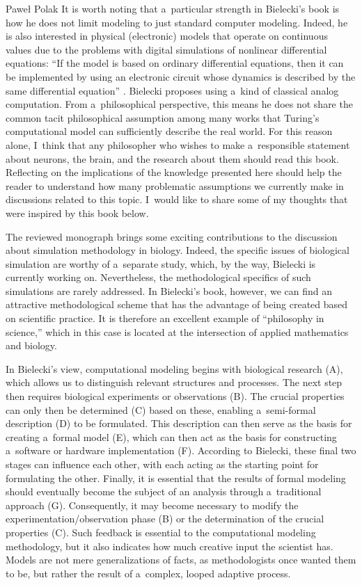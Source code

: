 \begin{newrevengenv}{Paweł Polak}
It is worth noting that a~particular strength in Bielecki's book is how he does not limit modeling to just standard computer modeling. Indeed, he is also interested in physical (electronic) models that operate on continuous values due to the problems with digital simulations of nonlinear differential equations: ``If the model is based on ordinary differential equations, then it can be implemented by using an electronic circuit whose dynamics is described by the same differential equation''
\parencite[][p.17]{bielecki_models_2019}. %
 Bielecki proposes using a~kind of classical analog computation. From a~philosophical perspective, this means he does not share the common tacit philosophical assumption among many works that Turing's computational model can sufficiently describe the real world. For this reason alone, I~think that any philosopher who wishes to make a~responsible statement about neurons, the brain, and the research about them should read this book. Reflecting on the implications of the knowledge presented here should help the reader to understand how many problematic assumptions we currently make in discussions related to this topic. I~would like to share some of my thoughts that were inspired by this book below.

The reviewed monograph brings some exciting contributions to the discussion about simulation methodology in biology. Indeed, the specific issues of biological simulation are worthy of a~separate study, which, by the way, Bielecki is currently working on. Nevertheless, the methodological specifics of such simulations are rarely addressed. In Bielecki's book, however, we can find an attractive methodological scheme that has the advantage of being created based on scientific practice. It is therefore an excellent example of ``philosophy in science,'' which in this case is located at the intersection of applied mathematics and biology.

In Bielecki's view, computational modeling begins with biological research (A), which allows us to distinguish relevant structures and processes. The next step then requires biological experiments or observations (B). The crucial properties can only then be determined (C) based on these, enabling a~semi-formal description (D) to be formulated. This description can then serve as the basis for creating a~formal model (E), which can then act as the basis for constructing a~software or hardware implementation (F). According to Bielecki, these final two stages can influence each other, with each acting as the starting point for formulating the other. Finally, it is essential that the results of formal modeling should eventually become the subject of an analysis through a~traditional approach (G). Consequently, it may become necessary to modify the experimentation/observation phase (B) or the determination of the crucial properties (C). Such feedback is essential to the computational modeling methodology, but it also indicates how much creative input the scientist has. Models are not mere generalizations of facts, as methodologists once wanted them to be, but rather the result of a~complex, looped adaptive process.


\end{newrevengenv}
